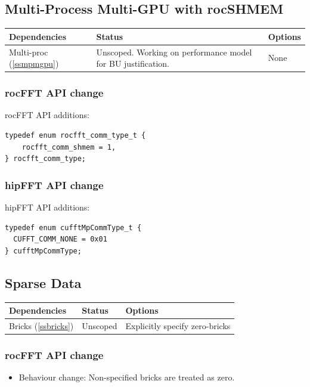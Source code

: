 \documentclass[12pt]{article}
\renewcommand{\(}{\left(}
\renewcommand{\)}{\right)}
\begin{document}
\newpage
\subsection{Multi-Process Multi-GPU with rocSHMEM}

\begin{center}
  \begin{tabular}{|l|p{4cm}|l|}
    \hline
    Dependencies & Status & Options \\
    \hline
    Multi-proc (\ref{ssmpmgpu}) & Unscoped.   Working on performance model for BU justification.    & None \\
    \hline
  \end{tabular}
\end{center}

\subsubsection{rocFFT API change}
\noindent
rocFFT API additions:
\begin{lstlisting}
typedef enum rocfft_comm_type_t {
    rocfft_comm_shmem = 1,
} rocfft_comm_type;
\end{lstlisting}

\subsubsection{hipFFT API change}
\noindent
hipFFT API additions:
\begin{lstlisting}
typedef enum cufftMpCommType_t {
  CUFFT_COMM_NONE = 0x01
} cufftMpCommType;
\end{lstlisting}

\newpage
\subsection{Sparse Data}


\begin{center}
  \begin{tabular}{|l|l|l|}
    \hline
    Dependencies & Status & Options \\
    \hline
    Bricks (\ref{ssbricks}) & Unscoped   & Explicitly specify zero-bricks \\
    \hline
  \end{tabular}
\end{center}

\subsubsection{rocFFT API change}
\begin{itemize}
\item Behaviour change: Non-specified bricks are treated as zero.
\end{itemize} 
\end{document}
